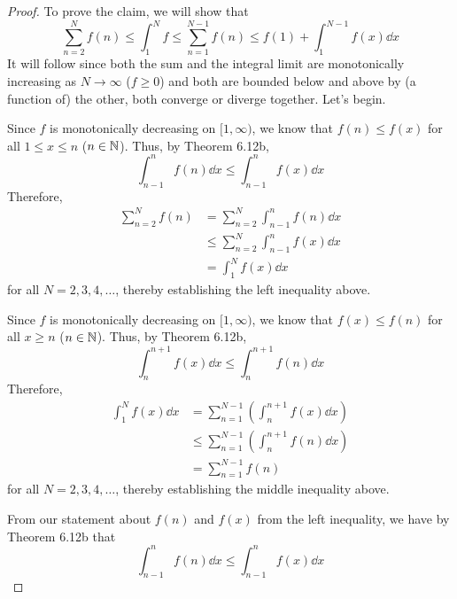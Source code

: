 \documentclass[../psets.tex]{subfiles}
\begin{document}
\begin{enumerate}[label={\textbf{\arabic*.}}]
\begin{proof}
        To prove the claim, we will show that
        \begin{equation*}
            \sum_{n=2}^Nf(n) \leq \int_1^Nf
            \leq \sum_{n=1}^{N-1}f(n)
            \leq f(1)+\int_1^{N-1}f(x)\dd{x}
        \end{equation*}
        It will follow since both the sum and the integral limit are monotonically increasing as $N\to\infty$ ($f\geq 0$) and both are bounded below and above by (a function of) the other, both converge or diverge together. Let's begin.\par\smallskip
        Since $f$ is monotonically decreasing on $[1,\infty)$, we know that $f(n)\leq f(x)$ for all $1\leq x\leq n$ ($n\in\mathbb{N}$). Thus, by Theorem 6.12b,
        \begin{equation*}
            \int_{n-1}^nf(n)\dd{x} \leq \int_{n-1}^nf(x)\dd{x}
        \end{equation*}
        Therefore,
        \begin{align*}
            \sum_{n=2}^Nf(n) &= \sum_{n=2}^N\int_{n-1}^nf(n)\dd{x}\tag*{Theorem 6.12d}\\
            &\leq \sum_{n=2}^N\int_{n-1}^nf(x)\dd{x}\\
            &= \int_1^Nf(x)\dd{x}\tag*{Theorem 6.12c}
        \end{align*}
        for all $N=2,3,4,\dots$, thereby establishing the left inequality above.\par
        Since $f$ is monotonically decreasing on $[1,\infty)$, we know that $f(x)\leq f(n)$ for all $x\geq n$ ($n\in\mathbb{N}$). Thus, by Theorem 6.12b,
        \begin{equation*}
            \int_n^{n+1}f(x)\dd{x} \leq \int_n^{n+1}f(n)\dd{x}
        \end{equation*}
        Therefore,
        \begin{align*}
            \int_1^Nf(x)\dd{x} &= \sum_{n=1}^{N-1}\left( \int_n^{n+1}f(x)\dd{x} \right)\tag*{Theorem 6.12c}\\
            &\leq \sum_{n=1}^{N-1}\left( \int_n^{n+1}f(n)\dd{x} \right)\\
            &= \sum_{n=1}^{N-1}f(n)\tag*{Theorem 6.12d}
        \end{align*}
        for all $N=2,3,4,\dots$, thereby establishing the middle inequality above.\par
        From our statement about $f(n)$ and $f(x)$ from the left inequality, we have by Theorem 6.12b that
        \begin{equation*}
            \int_{n-1}^nf(n)\dd{x} \leq \int_{n-1}^nf(x)\dd{x}

\end{equation*}
\end{proof}
\end{enumerate}
\end{document}
